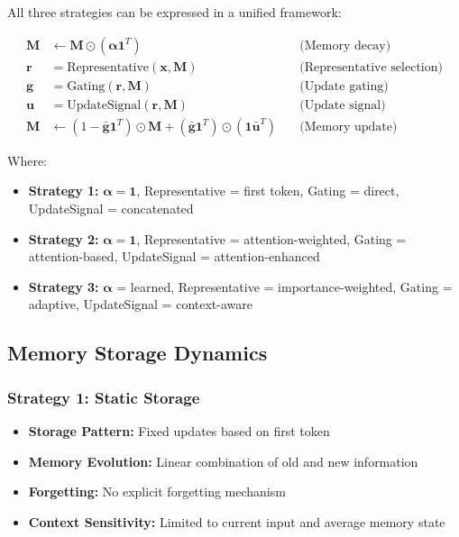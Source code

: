 \documentclass{article}
\begin{document}
All three strategies can be expressed in a unified framework:

\begin{align}
\mathbf{M} &\leftarrow \mathbf{M} \odot (\boldsymbol{\alpha} \mathbf{1}^T) \quad &\text{(Memory decay)} \\
\mathbf{r} &= \text{Representative}(\mathbf{x}, \mathbf{M}) \quad &\text{(Representative selection)} \\
\mathbf{g} &= \text{Gating}(\mathbf{r}, \mathbf{M}) \quad &\text{(Update gating)} \\
\mathbf{u} &= \text{UpdateSignal}(\mathbf{r}, \mathbf{M}) \quad &\text{(Update signal)} \\
\mathbf{M} &\leftarrow (1 - \bar{\mathbf{g}} \mathbf{1}^T) \odot \mathbf{M} + (\bar{\mathbf{g}} \mathbf{1}^T) \odot (\mathbf{1} \bar{\mathbf{u}}^T) \quad &\text{(Memory update)}
\end{align}

Where:
\begin{itemize}
\item \textbf{Strategy 1:} $\boldsymbol{\alpha} = \mathbf{1}$, Representative = first token, Gating = direct, UpdateSignal = concatenated
\item \textbf{Strategy 2:} $\boldsymbol{\alpha} = \mathbf{1}$, Representative = attention-weighted, Gating = attention-based, UpdateSignal = attention-enhanced
\item \textbf{Strategy 3:} $\boldsymbol{\alpha}$ = learned, Representative = importance-weighted, Gating = adaptive, UpdateSignal = context-aware
\end{itemize}

\subsection{Memory Storage Dynamics}

\subsubsection{Strategy 1: Static Storage}
\begin{itemize}
\item \textbf{Storage Pattern:} Fixed updates based on first token
\item \textbf{Memory Evolution:} Linear combination of old and new information
\item \textbf{Forgetting:} No explicit forgetting mechanism
\item \textbf{Context Sensitivity:} Limited to current input and average memory state
\end{itemize}
\end{document}
